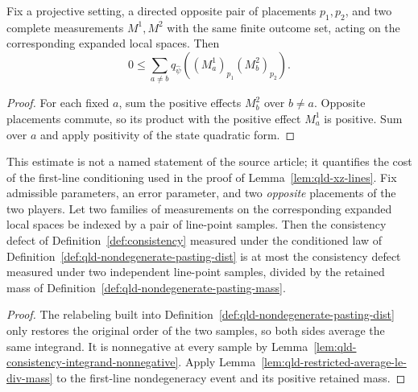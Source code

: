 	\begin{lemma}
		\label{lem:qld-consistency-integrand-nonnegative}
		\leanok
		Fix a projective setting, a directed opposite pair of placements $p_1,p_2$,
		and two complete measurements $M^1,M^2$ with the same finite outcome set,
		acting on the corresponding expanded local spaces. Then
		\[
			0\leq \sum_{a\ne b}
			q_{\hat\psi}\!\left((M^1_a)_{p_1}(M^2_b)_{p_2}\right).
		\]
	\end{lemma}
	\begin{proof}
		\leanok
		For each fixed $a$, sum the positive effects $M^2_b$ over $b\ne a$.
		Opposite placements commute, so its product with the positive effect
		$M^1_a$ is positive. Sum over $a$ and apply positivity of the state
		quadratic form.
	\end{proof}

	\begin{lemma}
		\label{lem:qld-conditioned-pasting-defect}
		\leanok
		This estimate is not a named statement of the source article; it quantifies
		the cost of the first-line conditioning used in the proof of
		Lemma~\ref{lem:qld-xz-lines}. Fix admissible parameters, an error
		parameter, and two \emph{opposite} placements of the two players. Let two
		families of measurements on the corresponding expanded local spaces be
		indexed by a pair of line-point samples. Then the consistency defect of
		Definition~\ref{def:consistency} measured under the conditioned law of
		Definition~\ref{def:qld-nondegenerate-pasting-dist} is at most the
		consistency defect measured under two independent line-point samples,
		divided by the retained mass of
		Definition~\ref{def:qld-nondegenerate-pasting-mass}.
	\end{lemma}
	\begin{proof}
		\leanok
		The relabeling built into
		Definition~\ref{def:qld-nondegenerate-pasting-dist} only restores the
		original order of the two samples, so both sides average the same
		integrand. It is nonnegative at every sample by
		Lemma~\ref{lem:qld-consistency-integrand-nonnegative}. Apply
		Lemma~\ref{lem:qld-restricted-average-le-div-mass} to the first-line
		nondegeneracy event and its positive retained mass.
	\end{proof}

